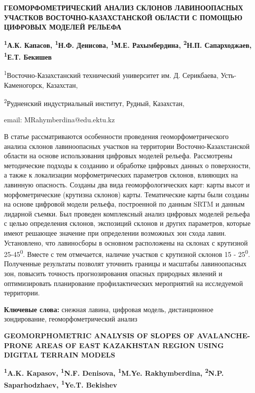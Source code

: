 \begin{articleheader}
{\bfseries ГЕОМОРФОМЕТРИЧЕСКИЙ АНАЛИЗ СКЛОНОВ ЛАВИНООПАСНЫХ УЧАСТКОВ ВОСТОЧНО-КАЗАХСТАНСКОЙ ОБЛАСТИ С ПОМОЩЬЮ ЦИФРОВЫХ МОДЕЛЕЙ РЕЛЬЕФА}

{\bfseries
\textsuperscript{1}А.К. Капасов,
\textsuperscript{1}Н.Ф. Денисова,
\textsuperscript{1}М.Е. Рахымбердина\textsuperscript{\envelope },
\textsuperscript{2}Н.П. Сапарходжаев,
\textsuperscript{1}Е.Т. Бекишев
}
\end{articleheader}

\begin{affiliation}
\textsuperscript{1}Восточно-Казахстанский технический университет им. Д. Серикбаева, Усть-Каменогорск, Казахстан,

\textsuperscript{2}Рудненский индустриальный институт, Рудный, Казахстан,

email: MRahymberdina@edu.ektu.kz
\end{affiliation}

В статье рассматриваются особенности проведения геоморфометрического
анализа склонов лавиноопасных участков на территории
Восточно-Казахстанской области на основе использования цифровых моделей
рельефа. Рассмотрены методические подходы к созданию и обработке
цифровых данных о поверхности, а также к локализации морфометрических
параметров склонов, влияющих на лавинную опасность. Созданы два вида
геоморфологических карт: карты высот и морфометрические (крутизна
склонов) карты. Тематические карты были созданы на основе цифровой
модели рельефа, построенной по данным SRTM и данным лидарной съемки. Был
проведен комплексный анализ цифровых моделей рельефа с целью определения
склонов, экспозиций склонов и других параметров, которые имеют решающее
значение при определении возможных зон схода лавин. Установлено, что
лавиносборы в основном расположены на склонах с крутизной
25-45\textsuperscript{0}. Вместе с тем отмечается, наличие участков с
крутизной склонов 15 - 25\textsuperscript{0}. Полученные результаты
позволят уточнить границы и масштабы лавиноопасных зон, повысить
точность прогнозирования опасных природных явлений и оптимизировать
планирование профилактических мероприятий на исследуемой территории.

{\bfseries Ключевые слова:} снежная лавина, цифровая модель, дистанционное
зондирование, геоморфометрический анализ

\begin{articleheader}
{\bfseries GEOMORPHOMETRIC ANALYSIS OF SLOPES OF AVALANCHE-PRONE AREAS OF EAST KAZAKHSTAN REGION USING DIGITAL TERRAIN MODELS}

{\bfseries
\textsuperscript{1}A.K. Kapasov,
\textsuperscript{1}N.F. Denisova,
\textsuperscript{1}M.Ye. Rakhymberdina\textsuperscript{\envelope },
\textsuperscript{2}N.P. Saparhodzhaev,
\textsuperscript{1}Ye.T. Bekishev
}
\end{articleheader}

